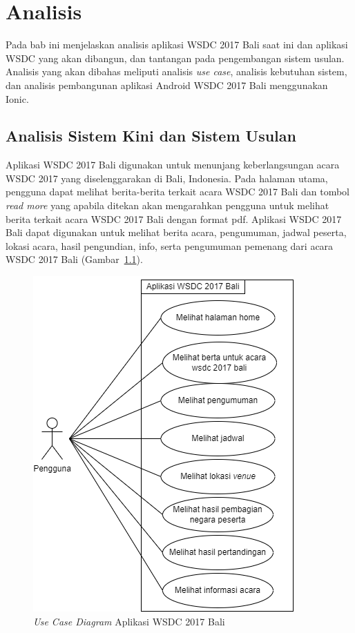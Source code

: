 \chapter{Analisis}
\label{chap:analisis}
Pada bab ini menjelaskan analisis aplikasi WSDC 2017 Bali saat ini dan aplikasi WSDC yang akan dibangun, dan tantangan pada pengembangan sistem usulan. Analisis yang akan dibahas meliputi analisis {\it use case}, analisis kebutuhan sistem, dan analisis pembangunan aplikasi Android WSDC 2017 Bali menggunakan Ionic.

\section{Analisis Sistem Kini dan Sistem Usulan}
\label{sec:analisisSistemKini}
\label{sec:analisisSistemUsulan}

Aplikasi WSDC 2017 Bali digunakan untuk menunjang keberlangsungan acara WSDC 2017 yang diselenggarakan di Bali, Indonesia. Pada halaman utama, pengguna dapat melihat berita-berita terkait acara WSDC 2017 Bali dan tombol {\it read more} yang apabila ditekan akan mengarahkan pengguna untuk melihat berita terkait acara WSDC 2017 Bali dengan format pdf. Aplikasi WSDC 2017 Bali dapat digunakan untuk melihat berita acara, pengumuman, jadwal peserta, lokasi acara, hasil pengundian, info, serta pengumuman pemenang dari acara WSDC 2017 Bali (Gambar~\ref{fig:useCaseDiagram}). 

\begin{figure}[H]
		\centering
	    \includegraphics[scale=0.45]{Gambar/useCaseDiagram.png}
	    \caption{{\it Use Case Diagram} Aplikasi WSDC 2017 Bali}
	    \label{fig:useCaseDiagram}
\end{figure}

